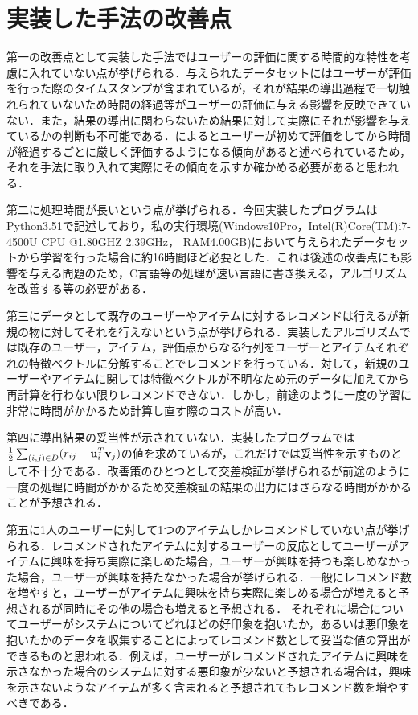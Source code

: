 \documentclass[a4j,titlepage]{jarticle}
\begin{document}
\section{実装した手法の改善点}
第一の改善点として実装した手法ではユーザーの評価に関する時間的な特性を考慮に入れていない点が挙げられる．与えられたデータセットにはユーザーが評価を行った際のタイムスタンプが含まれているが，それが結果の導出過程で一切触れられていないため時間の経過等がユーザーの評価に与える影響を反映できていない．また，結果の導出に関わらないため結果に対して実際にそれが影響を与えているかの判断も不可能である．\cite{a}によるとユーザーが初めて評価をしてから時間が経過するごとに厳しく評価するようになる傾向があると述べられているため，それを手法に取り入れて実際にその傾向を示すか確かめる必要があると思われる．

第二に処理時間が長いという点が挙げられる．今回実装したプログラムはPython3.51で記述しており，私の実行環境(Windows10Pro，Intel(R)Core(TM)i7-4500U CPU @1.80GHZ 2.39GHz， RAM4.00GB)において与えられたデータセットから学習を行った場合に約16時間ほど必要とした．これは後述の改善点にも影響を与える問題のため，C言語等の処理が速い言語に書き換える，アルゴリズムを改善する等の必要がある．

第三にデータとして既存のユーザーやアイテムに対するレコメンドは行えるが新規の物に対してそれを行えないという点が挙げられる．実装したアルゴリズムでは既存のユーザー，アイテム，評価点からなる行列をユーザーとアイテムそれぞれの特徴ベクトルに分解することでレコメンドを行っている．対して，新規のユーザーやアイテムに関しては特徴ベクトルが不明なため元のデータに加えてから再計算を行わない限りレコメンドできない．しかし，前途のように一度の学習に非常に時間がかかるため計算し直す際のコストが高い．

第四に導出結果の妥当性が示されていない．実装したプログラムでは$\frac{1}{2}\sum_{(i,j) \in D}(r_{ij}-{\bf u}_{i}^T{\bf v}_{j})$の値を求めているが，これだけでは妥当性を示すものとして不十分である．改善策のひとつとして交差検証が挙げられるが前途のように一度の処理に時間がかかるため交差検証の結果の出力にはさらなる時間がかかることが予想される．

第五に1人のユーザーに対して1つのアイテムしかレコメンドしていない点が挙げられる．レコメンドされたアイテムに対するユーザーの反応としてユーザーがアイテムに興味を持ち実際に楽しめた場合，ユーザーが興味を持つも楽しめなかった場合，ユーザーが興味を持たなかった場合が挙げられる．一般にレコメンド数を増やすと，ユーザーがアイテムに興味を持ち実際に楽しめる場合が増えると予想されるが同時にその他の場合も増えると予想される．
それぞれに場合についてユーザーがシステムについてどれほどの好印象を抱いたか，あるいは悪印象を抱いたかのデータを収集することによってレコメンド数として妥当な値の算出ができるものと思われる．例えば，ユーザーがレコメンドされたアイテムに興味を示さなかった場合のシステムに対する悪印象が少ないと予想される場合は，興味を示さないようなアイテムが多く含まれると予想されてもレコメンド数を増やすべきである．
\end{document}

